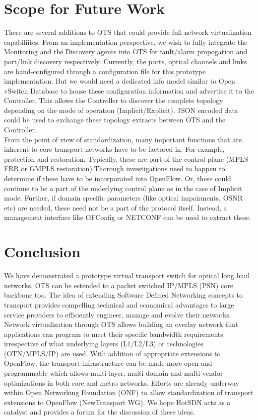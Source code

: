 \documentclass{sig-alternate-10pt}
\begin{document}
\section{Scope for Future Work}
\label{sec:future}
	There are several additions to OTS that could provide full network virtualization capabiliites. From an
	implementation perspective, we wish to fully integrate the Monitoring and the Discovery agents into
	OTS for fault/alarm propogation and port/link discovery respectively. Currently, the ports, optical 
	channels and links are hand-configured through a configuration file for this prototype implementation.
	But we would need a dedicated info model similar to Open vSwitch Database \cite{ovsdb} to house
	these configuration information and advertise it to the Controller. This allows the Controller to discover
	the complete topology depending on the mode of operation (Implicit/Explicit). JSON encoded data 
	could be used to exchange these topology extracts between OTS and the Controller. \\

	From the point of view of standardization, many important functions that are inherent to core transport networks
	have to be factored in. For example, protection and restoration. Typically, these are part of the
	control plane (MPLS FRR or GMPLS restoration).Thorough investigations need to happen to determine if
	these have to be incorporated into OpenFlow. Or, these could continue to be a part of the underlying control
	plane as in the case of Implicit mode. Further, if domain specific parameters (like optical impairments, OSNR etc)
	are needed, these need not be a part of the protocol itself. Instead, a management interface like OFConfig or
	NETCONF can be used to extract these.

\section{Conclusion}
	We have demonstrated a prototype virtual transport switch for optical long haul networks. OTS can be
	estended to a packet switched IP/MPLS (PSN) core backbone too. The idea of extending Software Defined
	Networking concepts to transport provides compelling technical and economical advantages to large service
	providers to efficiently engineer, manage and evolve their networks. Network virtualization through OTS
	allows building an overlay network that applications can program to meet their specific bandwidth
	requirements irrespective of what underlying layers (L1/L2/L3) or technologies (OTN/MPLS/IP) are used.
	With addition of appropriate extensions to OpenFlow, the transport infrastructure can be made more open
	and programmable which allows multi-layer, multi-domain and multi-vendor optimizations in both core and
	metro networks. Efforts are already underway within Open Networking Foundation (ONF) to allow
	standardization of transport extensions to OpenFlow (NewTransport WG). We hope HotSDN acts as
	a catalyst and provides a forum for the discussion of these ideas.


 
\end{document}
